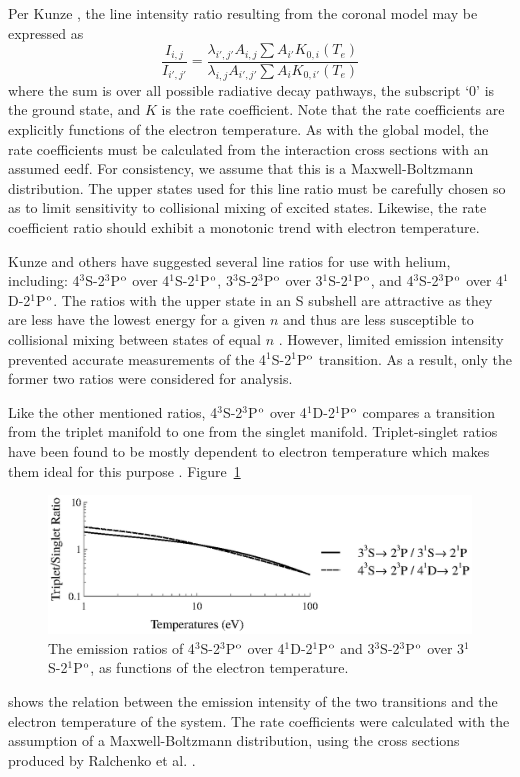 Per Kunze \cite{Kunze2009}, the line intensity ratio resulting from the coronal
model may be expressed as
\begin{equation}
  \frac{I_{i,j}}{I_{i',j'}} = \frac{\lambda_{i',j'}A_{i,j}\sum A_{i'} K_{0,i}(T_e)}
  {\lambda_{i,j}A_{i',j'}\sum A_{i} K_{0,i'}(T_e)}
\end{equation}
where the sum is over all possible radiative decay pathways, the subscript `0'
is the ground state, and $K$ is the rate coefficient. Note that the rate
coefficients are explicitly functions of the electron temperature. As with the
global model, the rate coefficients must be calculated from the interaction
cross sections with an assumed \acs{eedf}. For consistency, we assume that this
is a Maxwell-Boltzmann distribution. The upper states used for this line ratio
must be carefully chosen so as to limit sensitivity to collisional mixing of
excited states. Likewise, the rate coefficient ratio should exhibit a monotonic
trend with electron temperature.

Kunze and others have suggested several line ratios for use with helium,
including: 4$^3$S-2$^3$P$^\mathrm{o}$ over 4$^1$S-2$^1$P$^\mathrm{o}$, 3$^3$S-2$^3$P$^\mathrm{o}$
over 3$^1$S-2$^1$P$^\mathrm{o}$, and 4$^3$S-2$^3$P$^\mathrm{o}$ over 4$^1$D-2$^1$P$^\mathrm{o}$. The
ratios with the upper state in an S subshell are attractive as they are less
have the lowest energy for a given $n$ and thus are less susceptible to
collisional mixing between states of equal $n$ \cite{Kunze2009}. However,
limited emission intensity prevented accurate measurements of the
4$^1$S-2$^1$P$^\mathrm{o}$ transition. As a result, only the former two ratios were
considered for analysis.

Like the other mentioned ratios, 4$^3$S-2$^3$P$^\mathrm{o}$ over 4$^1$D-2$^1$P$^\mathrm{o}$
compares a transition from the triplet manifold to one from the singlet
manifold. Triplet-singlet ratios have been found to be mostly dependent to
electron temperature which makes them ideal for this purpose \cite{Griem2005}.
Figure~\ref{fig:conversion}
\begin{figure}
  \centering
  \includegraphics{./chapters/emissions/figures/conversion.eps}
  \caption{The emission ratios of 4$^3$S-2$^3$P$^\mathrm{o}$ over 4$^1$D-2$^1$P$^\mathrm{o}$ 
    and 3$^3$S-2$^3$P$^\mathrm{o}$ over 3$^1$S-2$^1$P$^\mathrm{o}$, as functions of the
    electron temperature.}
  \label{fig:conversion}
\end{figure}
shows the relation between the emission intensity of the two transitions and the
electron temperature of the system. The rate coefficients were calculated with
the assumption of a Maxwell-Boltzmann distribution, using the cross sections
produced by Ralchenko et al. \cite{Ralchenko2008}. 

